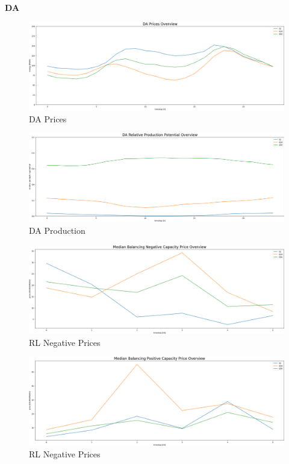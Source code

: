 \textbf{DA}
\begin{figure}[H]
	\centering
	\includegraphics[width=1\linewidth]{pictures/results/DAPrices.png}
	\caption{DA Prices}
	\label{fig:DAPrices}
\end{figure}
\begin{figure}[H]
	\includegraphics[width=1\linewidth]{pictures/results/DAProd.png}
	\caption{DA Production}
	\label{fig:DAProd}
\end{figure}


\begin{figure}[H]
	\centering
	\includegraphics[width=1\linewidth]{pictures/results/RL_negPrice_Overview.png}
	\caption{RL Negative Prices}
	\label{fig:RL_negPrice_Overview}
\end{figure}
\begin{figure}
	\includegraphics[width=1\linewidth]{pictures/results/RL_posPrice_Overview.png}
	\caption{RL Negative Prices}
	\label{fig:RL_posPrice_Overview}
\end{figure}


